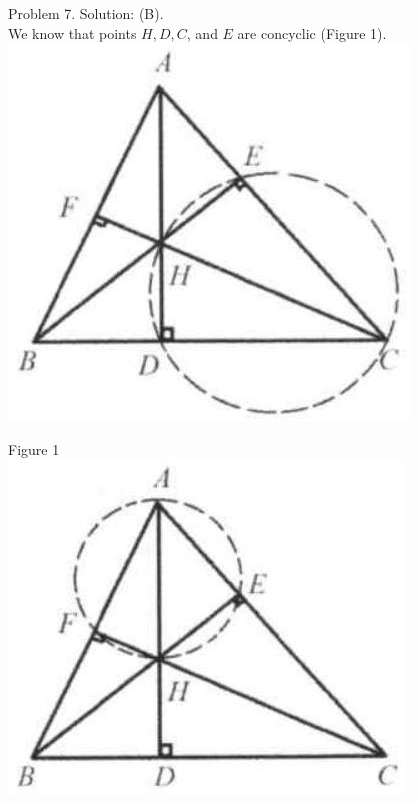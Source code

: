 \documentclass[10pt]{article}
\begin{document}
Problem 7. Solution: (B).\\
We know that points \(H, D, C\), and \(E\) are concyclic (Figure 1).\\
\includegraphics[max width=\textwidth, center]{2025_04_17_97bc1f7e44d93c271a88g-210(4)}

Figure 1\\
\includegraphics[max width=\textwidth, center]{2025_04_17_97bc1f7e44d93c271a88g-210(3)}
\end{document}
